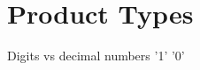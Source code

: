 \documentclass[DaoFP]{subfiles}
\begin{document}
\setcounter{chapter}{4}

\chapter{Product Types}

Digits vs decimal numbers '1' '0'

\begin{haskell}
\end{haskell}
\end{document}
